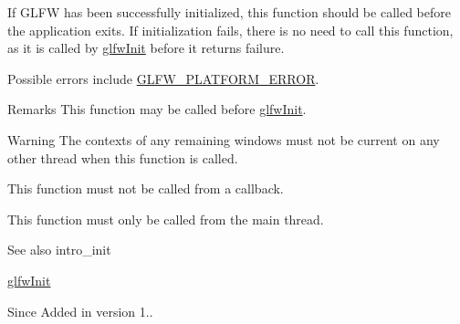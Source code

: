 If G\+L\+FW has been successfully initialized, this function should be called before the application exits. If initialization fails, there is no need to call this function, as it is called by \hyperlink{group__init_gab41771f0215a2e0afb4cf1cf98082d40}{glfw\+Init} before it returns failure.

Possible errors include \hyperlink{group__errors_gad44162d78100ea5e87cdd38426b8c7a1}{G\+L\+F\+W\+\_\+\+P\+L\+A\+T\+F\+O\+R\+M\+\_\+\+E\+R\+R\+OR}.

\begin{DoxyRemark}{Remarks}
This function may be called before \hyperlink{group__init_gab41771f0215a2e0afb4cf1cf98082d40}{glfw\+Init}.
\end{DoxyRemark}
\begin{DoxyWarning}{Warning}
The contexts of any remaining windows must not be current on any other thread when this function is called.
\end{DoxyWarning}
This function must not be called from a callback.

This function must only be called from the main thread.

\begin{DoxySeeAlso}{See also}
intro\+\_\+init 

\hyperlink{group__init_gab41771f0215a2e0afb4cf1cf98082d40}{glfw\+Init}
\end{DoxySeeAlso}
\begin{DoxySince}{Since}
Added in version 1.. 
\end{DoxySince}
